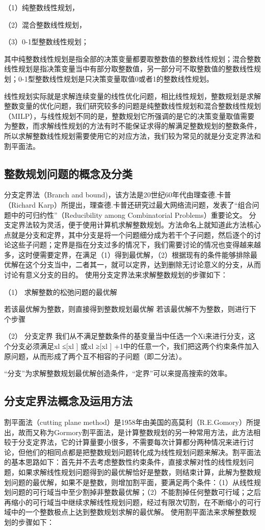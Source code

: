 	（1）纯整数线性规划，
	
	（2）混合整数线性规划，
	
	（3）0-1型整数线性规划；
	
	其中纯整数线性规划是指全部的决策变量都要取整数值的整数线性规划；混合整数线性规划是指决策变量当中有部分取整数值，另一部分可不取整数值的整数线性规划；0-1型整数线性规划是只决策变量取值0或者1的整数线性规划。
	
线性规划实际就是求解连续变量的线性优化问题，相比线性规划，整数规划是求解整数变量的优化问题，我们研究较多的问题是纯整数线性规划和混合整数线性规划（MILP），与线性规划不同的是，整数规划它所强调的是它的决策变量取值需要为整数，而求解线性规划的方法有时不能保证求得的解满足整数规划的整数条件，所以求解整数线性规划需要使用它的对应方法，我们较为常见的就是分支定界法和割平面法。

	
	\subsection{整数规划问题的概念及分类}
	
	分支定界法（Branch and bound)，该方法是20世纪60年代由理查德.卡普（Richard Karp）所提出，理查德.卡普还研究过最大网络流问题，发表了“组合问题中的可归约性”（Reducibility among Combinatorial Problems）重要论文。 分支定界法较为灵活，便于使用计算机求解整数规划。方法命名上就知道此方法核心点就是分支和定界，其中分支是将一个问题细分成为若干个子问题，然后逐个的讨论这些子问题；定界是指在分支过多的情况下，我们需要讨论的情况也变得越来越多，这时便需要定界，在满足（1）得到最优解，（2）根据现有的条件能够排除最优解在这个分支当中，二者其一，就可以定界，达到删除无讨论意义的分支，从而讨论有意义分支的目的。
使用分支定界法来求解整数规划的步骤如下：

（1）	求解整数的松弛问题的最优解

若该最优解为整数，则直接得到整数规划最优解
若该最优解不为整数，则进行下个步骤

（2）	分支定界
我们从不满足整数条件的基变量当中任选一个Xi来进行分支，这个分支必须满足xl ≤[xl ] 或xl ≥[xl ] +1中的任意一个，我们把这两个约束条件加入原问题，从而形成了两个互不相容的子问题（即二分法）。

“分支”为求解整数规划最优解创造条件，“定界”可以来提高搜索的效率。

	
	\subsection{分支定界法概念及运用方法}
	
	割平面法（cutting plane method）是1958年由美国的高莫利（R.E.Gomory）所提出，故而又称为Gormory割平面法，是计算整数规划的另一种常用方法，此方法相较于分支定界法，它的计算量要小很多，不需要每次计算都分两种情况来进行讨论，但他们的相同点都是把整数规划问题转化成为线性规划问题来解决。割平面法的基本思路如下：首先并不去考虑整数性约束条件，直接求解对性的线性规划问题，如果求解线性规划问题得到的最优解恰好是整数，则结束计算，此解为整数规划问题的最优解，如果不是整数，则增加割平面，要满足两个条件：（1）从线性规划问题的可行域当中至少割掉非整数最优解；（2）不能割掉任何整数可行域；之后再缩小的可行域当中继续求解线性规划问题，经过有限次切割，在不断缩小的可行域中的一个整数极点上达到整数规划求解的最优解。
使用割平面法来求解整数规划的步骤如下：

